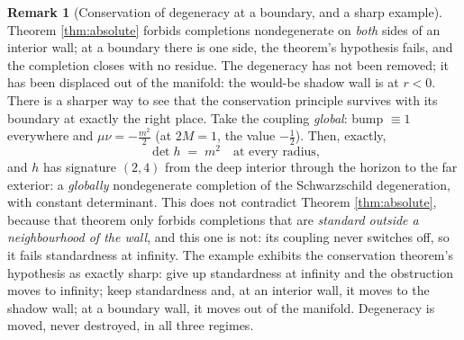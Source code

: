 \documentclass[11pt]{article}
\theoremstyle{definition}
\newtheorem{remark}[theorem]{Remark}
\begin{document}
\begin{remark}[Conservation of degeneracy at a boundary, and a sharp example]\label{rem:schwconservation}
Theorem \ref{thm:absolute} forbids completions nondegenerate on \emph{both} sides of an interior wall; at a boundary there is one side, the theorem's hypothesis fails, and the completion closes with no residue. The degeneracy has not been removed; it has been displaced out of the manifold: the would-be shadow wall is at $r < 0$. There is a sharper way to see that the conservation principle survives with its boundary at exactly the right place. Take the coupling \emph{global}: bump $\equiv 1$ everywhere and $\mu\nu = -\tfrac{m^2}{2}$ (at $2M = 1$, the value $-\tfrac12$). Then, exactly,
\[
\det h \;=\; m^2 \quad \text{at every radius,}
\]
and $h$ has signature $(2,4)$ from the deep interior through the horizon to the far exterior: a \emph{globally} nondegenerate completion of the Schwarzschild degeneration, with constant determinant. This does not contradict Theorem \ref{thm:absolute}, because that theorem only forbids completions that are \emph{standard outside a neighbourhood of the wall}, and this one is not: its coupling never switches off, so it fails standardness at infinity. The example exhibits the conservation theorem's hypothesis as exactly sharp: give up standardness at infinity and the obstruction moves to infinity; keep standardness and, at an interior wall, it moves to the shadow wall; at a boundary wall, it moves out of the manifold. Degeneracy is moved, never destroyed, in all three regimes.
\end{remark}
\end{document}
